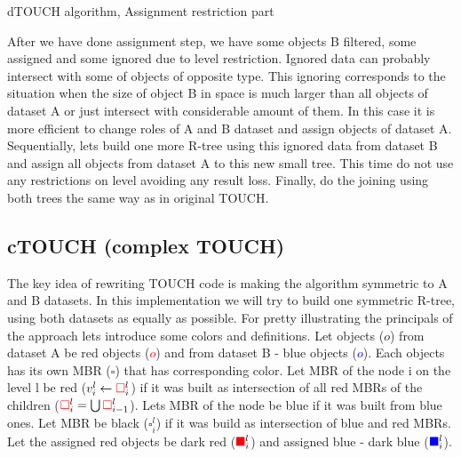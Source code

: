 \documentclass{sig-alternate}
\begin{document}
\begin{algorithm}
\caption{dTOUCH algorithm, Assignment restriction part}\label{touchcodeassign}
\begin{algorithmic}[1]
    \Loop
	\EndIf
	  \EndIf
	\EndIf
      \EndFor
    \EndLoop
  \EndFor
\EndFunction
\end{algorithmic}
\end{algorithm}

After we have done assignment step, we have some objects B filtered, some assigned and some ignored due to level restriction. Ignored data can probably intersect with some of objects of opposite type. This ignoring corresponds to the situation when the size of object B in space is much larger than all objects of dataset A or just intersect with considerable amount of them. In this case it is more efficient to change roles of A and B dataset and assign objects of dataset A. Sequentially, lets build one more R-tree using this ignored data from dataset B and assign all objects from dataset A to this new small tree. This time do not use any restrictions on level avoiding any result loss. Finally, do the joining using both trees the same way as in original TOUCH.

\subsection{cTOUCH (complex TOUCH)}
The key idea of rewriting TOUCH code is making the algorithm symmetric to A and B datasets. In this implementation we will try to build one symmetric R-tree, using both datasets as equally as possible. For pretty illustrating the principals of the approach lets introduce some colors and definitions. Let objects ($o$) from dataset A be red objects (\textcolor{red}{$o$}) and from dataset B - blue objects (\textcolor{blue}{$o$}). Each objects has its own MBR ($ \square $) that has corresponding color. Let MBR of the node i on the level l be red ($v^l_i \leftarrow \textcolor{red}{\square}^l_i$) if it was built as intersection of all red MBRs of the children ($\textcolor{red}{\square}^{l}_i = \bigcup\textcolor{red}{\square}^{l}_{i-1}$). Lets MBR of the node be blue if it was built from blue ones. Let MBR be black ($\square^{l}_i$) if it was build as intersection of blue and red MBRs. Let the assigned red objects be dark red ($\textcolor{red}{\blacksquare}^{l}_i$) and assigned blue - dark blue ($\textcolor{blue}{\blacksquare}^{l}_i$).
\end{document}
